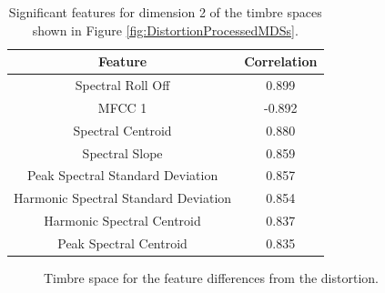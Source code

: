 		\begin{table}[h!]
			\centering
			\begin{tabular}{|c|c|}
				\hline
				\bf{Feature} & \bf{Correlation} \\
				\hline
				\hline
				Spectral Roll Off &  0.899 \\
				\hline
				MFCC 1 & -0.892 \\
				\hline
				Spectral Centroid &  0.880 \\
				\hline
				Spectral Slope &  0.859 \\
				\hline
				Peak Spectral Standard Deviation &  0.857 \\
				\hline
				Harmonic Spectral Standard Deviation &  0.854 \\
				\hline
				Harmonic Spectral Centroid &  0.837 \\
				\hline
				Peak Spectral Centroid &  0.835 \\
				\hline
			\end{tabular}
			\caption{Significant features for dimension 2 of the timbre spaces shown in Figure 
				 \ref{fig:DistortionProcessedMDSs}.}
			\label{tab:DistortionProcessedFeaturesDim2}
		\end{table}

		\begin{figure}[h!]
			\centering
			\qquad
			\caption{Timbre space for the feature differences from the distortion.}
			\label{fig:DistortionDifferenceMDSs}
		\end{figure}

